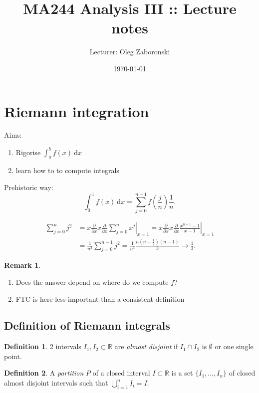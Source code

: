 \documentclass[a4paper]{article}
\title{MA244 Analysis III :: Lecture notes}
\author{Lecturer: Oleg Zaboronski}
\date{\today}
\theoremstyle{definition}
\newtheorem{defn}{Definition}[subsection]
\newtheorem*{remark}{Remark}
\begin{document}
\maketitle
\thispagestyle{empty}

\tableofcontents
\thispagestyle{empty}
\newpage
\setcounter{page}{1}

\section{Riemann integration}
Aims: \begin{enumerate}
	\item Rigorise $\int_a^b f(x) \ \mathrm d x$
	\item learn how to to compute integrals
\end{enumerate}
Prehistoric way:
\[
\int_0^1 f(x) \ \mathrm d x = \sum_{j=0}^{n-1} f \left( \frac{j}{n} \right) \frac1n .
\]

\[
\begin{aligned}\sum_{j=0}^n j^2 &= x \frac{\partial}{\partial x} x \frac{\partial}{\partial x} \left. \sum_{j=0}^n x^j \right|_{x=1}=x \frac{\partial}{\partial x} x \frac{\partial}{\partial x} \left. \frac{x^{n+1}-1}{x-1} \right|_{x=1} \\ &=\frac{1}{n^3}\sum_{j=0}^{n-1}j^2 = \frac{1}{n^3}\frac{n(n-\frac12 )(n-1)}{3} \rightarrow \frac13 .\end{aligned}
\]

\begin{remark}
	\begin{enumerate}
		\item Does the answer depend on where do we compute $f$?
		\item FTC is here less important than a consistent definition
	\end{enumerate}
\end{remark}

\subsection{Definition of Riemann integrals}
\begin{defn}
	2 intervals $I_1, I_2 \subset \mathbb R$ are \textit{almost disjoint} if $I_1 \cap I_2 $ is $\emptyset$ or one single point.
\end{defn}

\begin{defn}
	A \textit{partition} $P$ of a closed interval $I \subset \mathbb R$ is a set $\{I_1,\ldots,I_n\}$ of closed almost disjoint intervals such that $\bigcup_{i=1}^n I_i=I$.
\end{defn}
\end{document}

